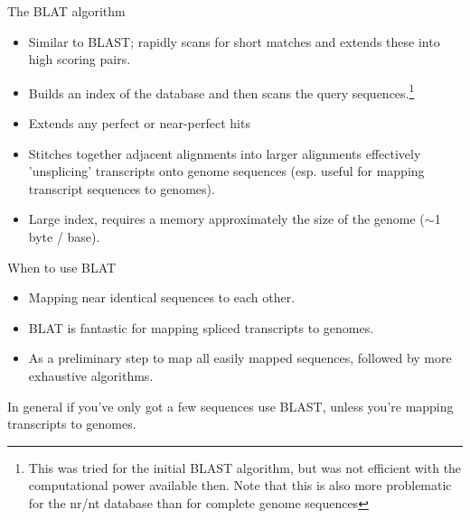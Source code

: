 \documentclass[pdf]{beamer}
\begin{document}
\begin{frame}{The BLAT algorithm}
  \begin{itemize}
    \item Similar to BLAST; rapidly scans for short matches and extends these
      into high scoring pairs.
    \item Builds an index of the database and then scans the query
      sequences.\footnote{
        This was tried for the initial BLAST algorithm, but was not efficient
        with the computational power available then. Note that this is also
        more problematic for the nr/nt database than for complete genome sequences}
    \item Extends any perfect or near-perfect hits
    \item Stitches together adjacent alignments into larger alignments
      effectively 'unsplicing' transcripts onto genome sequences
      (esp. useful for mapping transcript sequences to genomes).
    \item Large index, requires a memory approximately the size of the genome
      ($\sim$1 byte / base).
  \end{itemize}
\end{frame}

\begin{frame}{When to use BLAT}
  \begin{itemize}
  \item Mapping near identical sequences to each other.
  \item BLAT is fantastic for mapping spliced transcripts to genomes.
  \item As a preliminary step to map all easily mapped sequences, 
    followed by more exhaustive algorithms.
  \end{itemize}
  
  In general if you've only got a few sequences use BLAST, unless you're
  mapping transcripts to genomes.
\end{frame}
\end{document}
